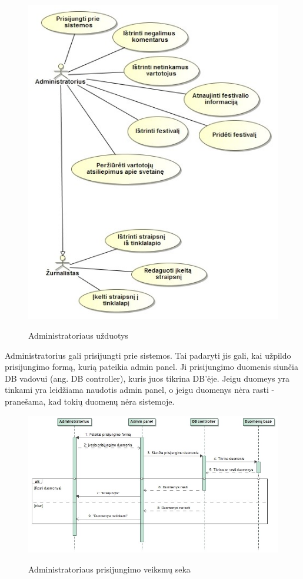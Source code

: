 ﻿\documentclass{VUMIFPSkursinis}
\begin{document}
\begin{figure}[H]
    \centering
    \includegraphics[scale=0.45]{img/Pav/Administratorius}
    \label{img:uml9}
	\caption{Administratoriaus užduotys}
\end{figure}	

Administratorius gali prisijungti prie sistemos. Tai padaryti jis gali, kai užpildo prisijungimo formą, kurią pateikia admin panel. Ji prisijungimo duomenis siunčia DB vadovui (ang. DB controller), kuris juos tikrina DB’ėje. Jeigu duomeys yra tinkami yra leidžiama naudotis admin panel, o jeigu duomenys nėra rasti - pranešama, kad tokių duomenų nėra sistemoje.

\begin{figure}[H]
    \centering
    \includegraphics[scale=0.45]{img/Pav/AdminPrisijungtiPrieSis}
    \label{img:uml10}
	\caption{Administratoriaus prisijungimo veiksmų seka}
\end{figure}
\end{document}
